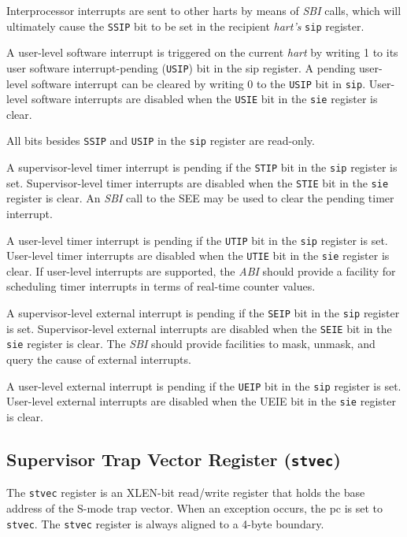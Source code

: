 Interprocessor interrupts are sent to other harts by means of \emph{SBI}
calls, which will ultimately cause the {\tt SSIP} bit to be set in the
recipient \emph{hart's} {\tt sip} register.

A user-level software interrupt is triggered on the current \emph{hart}
by writing 1 to its user software interrupt-pending ({\tt USIP}) bit in the
sip register. A pending user-level software interrupt can be cleared by
writing 0 to the {\tt USIP} bit in {\tt sip}. User-level software interrupts are
disabled when the {\tt USIE} bit in the {\tt sie} register is clear.

All bits besides {\tt SSIP} and {\tt USIP} in the {\tt sip} register are read-only.

A supervisor-level timer interrupt is pending if the {\tt STIP} bit in the {\tt sip}
register is set. Supervisor-level timer interrupts are disabled when the
{\tt STIE} bit in the {\tt sie} register is clear. An \emph{SBI} call to the SEE may
be used to clear the pending timer interrupt.

A user-level timer interrupt is pending if the {\tt UTIP} bit in the {\tt sip}
register is set. User-level timer interrupts are disabled when the {\tt UTIE}
bit in the {\tt sie} register is clear. If user-level interrupts are
supported, the \emph{ABI} should provide a facility for scheduling timer
interrupts in terms of real-time counter values.

A supervisor-level external interrupt is pending if the {\tt SEIP} bit in the
{\tt sip} register is set. Supervisor-level external interrupts are disabled
when the {\tt SEIE} bit in the {\tt sie} register is clear. The \emph{SBI} should
provide facilities to mask, unmask, and query the cause of external
interrupts.

A user-level external interrupt is pending if the {\tt UEIP} bit in the {\tt sip}
register is set. User-level external interrupts are disabled when the
UEIE bit in the {\tt sie} register is clear.

\subsection{Supervisor Trap Vector Register
({\tt stvec})}\label{supervisor-trap-vector-register-stvec}

The {\tt stvec} register is an XLEN-bit read/write register that holds the
base address of the S-mode trap vector. When an exception occurs, the pc
is set to {\tt stvec}. The {\tt stvec} register is always aligned to a 4-byte
boundary.

